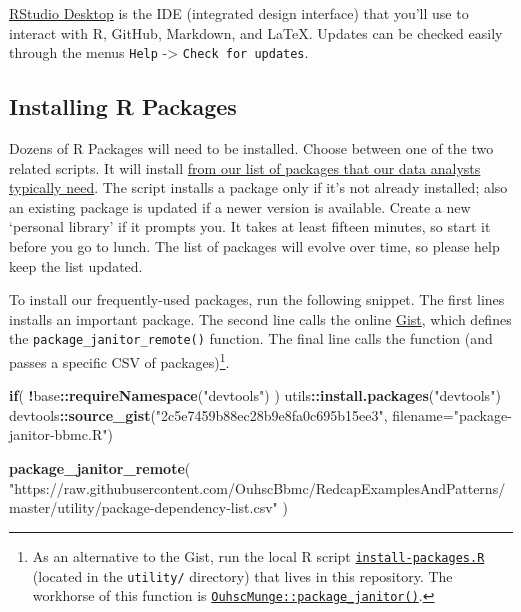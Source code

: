 \documentclass[]{book}
\newenvironment{Shaded}{\begin{snugshade}}{\end{snugshade}}
\newcommand{\ControlFlowTok}[1]{\textcolor[rgb]{0.13,0.29,0.53}{\textbf{#1}}}
\newcommand{\DataTypeTok}[1]{\textcolor[rgb]{0.13,0.29,0.53}{#1}}
\newcommand{\KeywordTok}[1]{\textcolor[rgb]{0.13,0.29,0.53}{\textbf{#1}}}
\newcommand{\NormalTok}[1]{#1}
\newcommand{\OperatorTok}[1]{\textcolor[rgb]{0.81,0.36,0.00}{\textbf{#1}}}
\newcommand{\StringTok}[1]{\textcolor[rgb]{0.31,0.60,0.02}{#1}}
\let\rmarkdownfootnote\footnote%
\def\footnote{\protect\rmarkdownfootnote}
\begin{document}
\href{http://www.rstudio.com/ide/download/desktop}{RStudio Desktop} is the IDE (integrated design interface) that you'll use to interact with R, GitHub, Markdown, and LaTeX. Updates can be checked easily through the menus \texttt{Help} -\textgreater{} \texttt{Check\ for\ updates}.

\hypertarget{installing-r-packages}{%
\subsection{Installing R Packages}\label{installing-r-packages}}

Dozens of R Packages will need to be installed. Choose between one of the two related scripts. It will install \href{https://github.com/OuhscBbmc/RedcapExamplesAndPatterns/blob/master/utility/package-dependency-list.csv}{from our list of packages that our data analysts typically need}. The script installs a package only if it's not already installed; also an existing package is updated if a newer version is available. Create a new `personal library' if it prompts you. It takes at least fifteen minutes, so start it before you go to lunch. The list of packages will evolve over time, so please help keep the list updated.

To install our frequently-used packages, run the following snippet. The first lines installs an important package. The second line calls the online \href{https://gist.github.com/wibeasley/2c5e7459b88ec28b9e8fa0c695b15ee3}{Gist}, which defines the \texttt{package\_janitor\_remote()} function. The final line calls the function (and passes a specific CSV of packages)\footnote{As an alternative to the Gist, run the local R script \href{https://github.com/OuhscBbmc/RedcapExamplesAndPatterns/blob/master/utility/install-packages.R}{\texttt{install-packages.R}} (located in the \texttt{utility/} directory) that lives in this repository. The workhorse of this function is \href{https://github.com/OuhscBbmc/OuhscMunge/blob/master/R/package-janitor.R}{\texttt{OuhscMunge::package\_janitor()}}.}.

\begin{Shaded}
\begin{Highlighting}[]
\ControlFlowTok{if}\NormalTok{( }\OperatorTok{!}\NormalTok{base}\OperatorTok{::}\KeywordTok{requireNamespace}\NormalTok{(}\StringTok{"devtools"}\NormalTok{) ) utils}\OperatorTok{::}\KeywordTok{install.packages}\NormalTok{(}\StringTok{"devtools"}\NormalTok{)}
\NormalTok{devtools}\OperatorTok{::}\KeywordTok{source_gist}\NormalTok{(}\StringTok{"2c5e7459b88ec28b9e8fa0c695b15ee3"}\NormalTok{, }\DataTypeTok{filename=}\StringTok{"package-janitor-bbmc.R"}\NormalTok{)}

\KeywordTok{package_janitor_remote}\NormalTok{(}
  \StringTok{"https://raw.githubusercontent.com/OuhscBbmc/RedcapExamplesAndPatterns/master/utility/package-dependency-list.csv"}
\NormalTok{)        }
\end{Highlighting}
\end{Shaded}
\end{document}
